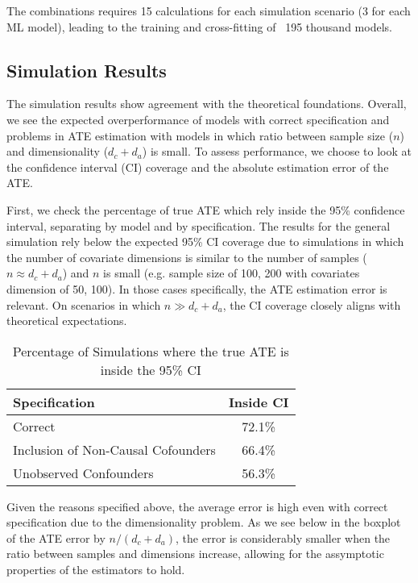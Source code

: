 \documentclass{article}
\numberwithin{equation}{section}
\begin{document}
The combinations requires 15 calculations for each simulation scenario (3 for each ML model), leading to the training and cross-fitting of ~195 thousand models.

\subsection{Simulation Results}

The simulation results show agreement with the theoretical foundations. Overall, we see the expected overperformance of models with correct specification and problems in ATE estimation with models in which ratio between sample size ($n$) and dimensionality ($d_c + d_a$) is small. To assess performance, we choose to look at the confidence interval (CI) coverage and the absolute estimation error of the ATE.

First, we check the percentage of true ATE which rely inside the 95\% confidence interval, separating by model and by specification. The results for the general simulation rely below the expected 95\% CI coverage due to simulations in which the number of covariate dimensions is similar to the number of samples ($n \approx d_c + d_a$) and $n$ is small (e.g. sample size of 100, 200 with covariates dimension of 50, 100). In those cases specifically, the ATE estimation error is relevant. On scenarios in which $n \gg d_c + d_a$, the CI coverage closely aligns with theoretical expectations.

\begin{table}[H]
    \centering
    \begin{tabular}{lc}
        \toprule
        Specification & Inside CI \\
        \midrule
        Correct & 72.1\% \\
        Inclusion of Non-Causal Cofounders & 66.4\% \\
        Unobserved Confounders & 56.3\% \\
        \bottomrule
    \end{tabular}
    \caption{Percentage of Simulations where the true ATE is inside the 95\% CI}
\end{table}

Given the reasons specified above, the average error is high even with correct specification due to the dimensionality problem. As we see below in the boxplot of the ATE error by $n / (d_c + d_a)$, the error is considerably smaller when the ratio between samples and dimensions increase, allowing for the assymptotic properties of the estimators to hold.
\end{document}
